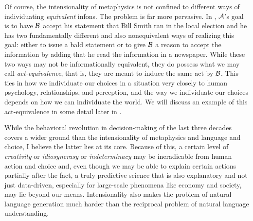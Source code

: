 
%


Of course, the intensionality of metaphysics is not confined to different ways of individuating \emph{equivalent} infons. The problem is far more pervasive. In , $\cal A$'s goal is to have $\cal B$ accept his statement that Bill Smith ran in the local election and he has two fundamentally different and also nonequivalent ways of realizing this goal: either to issue a bald statement or to give $\cal B$ a reason to accept the information by adding that he read the information in a newspaper. While these two ways may not be informationally equivalent, they do possess what we may call \emph{act-equivalence}, that is, they are meant to induce the same act by $\cal B$. This ties in how we individuate our choices in a situation very closely to human psychology, relationships, and perception, and the way we individuate our choices depends on how we can individuate the world. We will discuss an example of this act-equivalence in some detail later in .

While the behavioral revolution in decision-making of the last three decades covers a wider ground than the intensionality of metaphysics and language and choice, I believe the latter lies at its core. Because of this, a certain level of \emph{creativity} or \emph{idiosyncrasy} or \emph{indeterminacy} may be ineradicable from human action and choice and, even though we may be able to explain certain actions partially after the fact, a truly predictive science that is also explanatory and not just data-driven, especially for large-scale phenomena like economy and society, may lie beyond our means. Intensionality also makes the problem of natural language generation much harder than the reciprocal problem of natural language understanding.

